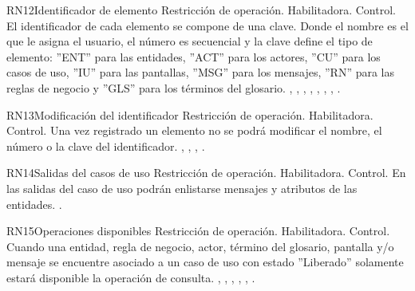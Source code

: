 \begin{BussinesRule}{RN12}{Identificador de elemento} 
	\BRitem[Tipo:] Restricción de operación. 
	\BRitem[Clase:] Habilitadora. 
	\BRitem[Nivel:] Control. %
	\BRitem[Descripción:] El identificador de cada elemento se compone de una clave. Donde el nombre es el que le asigna el usuario, el número es secuencial y la clave define el tipo de elemento: ''ENT'' para las entidades, ''ACT'' para los actores, ''CU'' para los casos de uso, ''IU'' para las pantallas, ''MSG'' para los mensajes, ''RN'' para las reglas de negocio y ''GLS'' para los términos del glosario.
	 , , , , , , , . 
\end{BussinesRule}

\begin{BussinesRule}{RN13}{Modificación del identificador} 
	\BRitem[Tipo:] Restricción de operación. 
	\BRitem[Clase:] Habilitadora. 
	\BRitem[Nivel:] Control. %
	\BRitem[Descripción:] Una vez registrado un elemento no se podrá modificar el nombre, el número o la clave del identificador.
	 , , , . 
\end{BussinesRule}

\begin{BussinesRule}{RN14}{Salidas del casos de uso} 
	\BRitem[Tipo:] Restricción de operación. 
	\BRitem[Clase:] Habilitadora. 
	\BRitem[Nivel:] Control. %
	\BRitem[Descripción:] En las salidas del caso de uso podrán enlistarse mensajes y atributos de las entidades.
	 \UCref{}{}. 
\end{BussinesRule}

\begin{BussinesRule}{RN15}{Operaciones disponibles} 
	\BRitem[Tipo:] Restricción de operación. 
	\BRitem[Clase:] Habilitadora. 
	\BRitem[Nivel:] Control. %
	\BRitem[Descripción:] Cuando una entidad, regla de negocio, actor, término del glosario, pantalla y/o mensaje se encuentre asociado a un caso de uso con estado ''Liberado'' solamente estará disponible la operación de consulta.
	 , , , , , . 
\end{BussinesRule}

